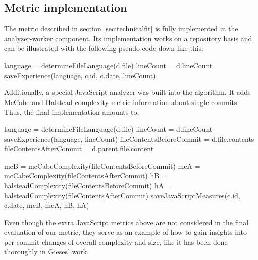 \subsection{Metric implementation}\label{sec:metric-implementation}
The metric described in section \ref{sec:technicalfit} is fully implemented in the analyzer-worker component. Its implementation works on a repository basis and can be illustrated with the following pseudo-code down like this:\\[.25em]

\begin{algorithmic}
    \State language = determineFileLanguage(d.file)
    \State lineCount = d.lineCount
    \State saveExperience(language, c.id, c.date, lineCount)
  \EndFor
\EndFor
\end{algorithmic}
\vspace{0.75em}

Additionally, a special JavaScript analyzer was built into the algorithm. It adds McCabe\cite{mc:1976} and Halstead\cite{h:1977} complexity metric information about single commits. Thus, the final implementation amounts to:\\[.25em]

\begin{minipage}{\linewidth}
\begin{algorithmic}
    \State language = determineFileLanguage(d.file)
    \State lineCount = d.lineCount
    \State saveExperience(language, lineCount)
    \State
      \State fileContentsBeforeCommit = d.file.contents
      \State fileContentsAfterCommit  = d.parent.file.content

      \State mcB = mcCabeComplexity(fileContentsBeforeCommit)
      \State mcA = mcCabeComplexity(fileContentsAfterCommit)
      \State hB = halsteadComplexity(fileContentsBeforeCommit)
      \State hA = halsteadComplexity(fileContentsAfterCommit)
      \State
      \State saveJavaScriptMeasures(c.id, c.date, mcB, mcA, hB, hA)
    \EndIf
  \EndFor
\EndFor
\end{algorithmic}
\end{minipage}
\vspace{0.75em}

Even though the extra JavaScript metrics above are not considered in the final evaluation of our metric, they serve as an example of how to gain insights into per-commit changes of overall complexity and size, like it has been done thoroughly in Gieses' work\cite{pg:2014}.

